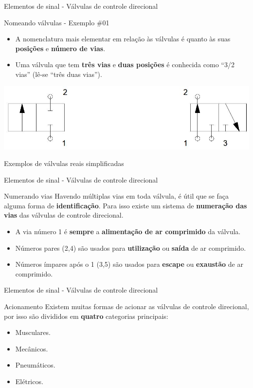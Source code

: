 \begin{frame}{Elementos de sinal - Válvulas de controle direcional}
	\begin{block}{Nomeando válvulas - Exemplo \#01}
		\begin{itemize}
			\item A nomenclatura mais elementar em relação às válvulas é quanto às suas \textbf{posições} e \textbf{número de vias}.
			\item Uma válvula que tem \textbf{três vias }e \textbf{duas posições }é conhecida como ``3/2 vias'' (lê-se ``três duas vias'').
		\end{itemize}
	\end{block}
	
	\medskip
	
	\centering
	\includegraphics[width=0.9\linewidth]{Figuras/Ch14/fig08}
	
	Exemplos de válvulas reais simplificadas
\end{frame}


\begin{frame}{Elementos de sinal - Válvulas de controle direcional}
	\begin{block}{Numerando vias}
		Havendo múltiplas vias em toda válvula, é útil que se faça alguma forma de \textbf{identificação}. Para isso existe um sistema de \textbf{numeração das vias} das válvulas de controle direcional.
		\begin{itemize}
			\item A via número 1 é \textbf{sempre} a \textbf{alimentação de ar comprimido} da válvula.
			\item Números pares (2,4) são usados para \textbf{utilização} ou \textbf{saída} de ar comprimido.
			\item Números ímpares após o 1 (3,5) são usados para \textbf{escape} ou \textbf{exaustão} de ar comprimido.
		\end{itemize}
	\end{block}
\end{frame}


\begin{frame}{Elementos de sinal - Válvulas de controle direcional}
	\begin{block}{Acionamento}
		Existem muitas formas de acionar as válvulas de controle direcional, por isso são divididos em \textbf{quatro} categorias principais:
		\begin{itemize}
			\item Musculares.
			\item Mecânicos.
			\item Pneumáticos.
			\item Elétricos.
		\end{itemize}
	\end{block}
\end{frame}


